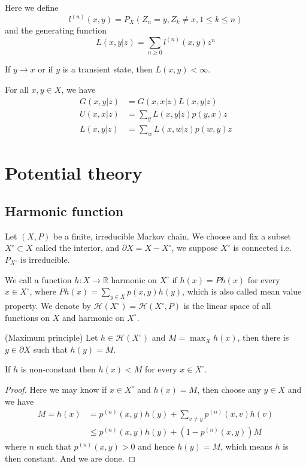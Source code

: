 \documentclass[lang=en, color=blue, ]{elegantbook}
\newcommand{\R}{\mathbb{R}}
\newcommand{\Har}{\mathcal{H}}
\begin{document}
\begin{definition}
    Here we define
    \[l^{(n)}(x,y) = P_X(Z_n = y, Z_k \neq x, 1\leq k \leq n)\]
    and the generating function
    \[L(x,y|z) = \sum\limits_{n\geq 0}l^{(n)}(x,y)z^n\]
\end{definition}

\begin{lemma}
    If $y\to x$ or if $y$ is a transient state, then $L(x,y) < \infty$.
\end{lemma}

\begin{proposition}
    For all $x,y\in X$, we have
    \[
    \begin{aligned}
        G(x,y|z) &= G(x,x|z)L(x,y|z) \\
        U(x,x|z) &= \sum_y L(x,y|z)p(y,x)z\\
        L(x,y|z) &= \sum_w L(x,w|z)p(w,y)z
    \end{aligned}
    \]
\end{proposition}

\chapter{Potential theory}

\section{Harmonic function}

\begin{definition}
    Let $(X,P)$ be a finite, irreducible Markov chain. We choose and fix a subset $X^{\circ} \subset X$ called the interior, and $\partial X = X - X^{\circ}$, we suppose $X^{\circ}$ is connected i.e. $P_{X^{\circ}}$ is irreducible.\par
    We call a function $h:X\to \R$ harmonic on $X^{\circ}$ if $h(x) = Ph(x)$ for every $x\in X^{\circ}$, where $Ph(x) = \sum\limits_{y \in X}p(x,y)h(y)$, which is also called mean value property. We denote by $\Har(X^{\circ}) = \Har(X^{\circ}, P)$ is the linear space of all functions on $X$ and harmonic on $X^{\circ}.$
\end{definition}

\begin{lemma}
    (Maximum principle) Let $h \in \Har(X^{\circ})$ and $M = \max_X h(x)$, then there is $y\in \partial X$ such that $h(y) = M$.\par
    If $h$ is non-constant then $h(x) < M$ for every $x\in X^{\circ}$.
\end{lemma}
\begin{proof}
    Here we may know if $x\in X^{\circ}$ and $h(x) = M$, then choose any $y\in X$ and we have
    \[
    \begin{aligned}
    M = h(x) &= p^{(n)}(x,y)h(y) + \sum\limits_{v\neq y}p^{(n)}(x,v)h(v) \\
    &\leq p^{(n)}(x,y)h(y) + (1-p^{(n)}(x,y))M
    \end{aligned}
    \]
    where $n$ such that $p^{(n)}(x,y) > 0$ and hence $h(y) = M$, which means $h$ is then constant. And we are done.
\end{proof}
\end{document}

